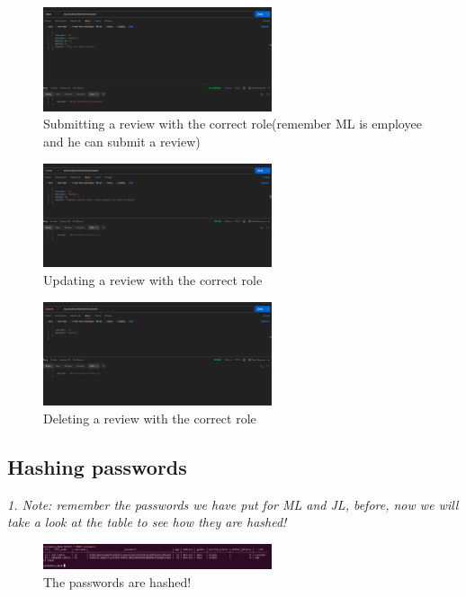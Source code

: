 \documentclass[a4paper,12pt]{article}
\begin{document}
\begin{figure}[H]
  \centering
  \includegraphics[width=0.6\textwidth]{images/26.png}
  \caption{Submitting a review with the correct role(remember ML is employee and he can submit a review)}
\end{figure}
\begin{figure}[H]
  \centering
  \includegraphics[width=0.6\textwidth]{images/27.png}
  \caption{Updating a review with the correct role}
\end{figure}
\begin{figure}[H]
  \centering
  \includegraphics[width=0.6\textwidth]{images/28.png}
  \caption{Deleting a review with the correct role}
\end{figure}
\subsection{Hashing passwords}
\textit{1. Note: remember the passwords we have put for ML and JL, before, now we will take a look at the table to see how they are hashed!}
\begin{figure}[H]
  \centering
  \includegraphics[width=0.6\textwidth]{images/29.png}
  \caption{The passwords are hashed!}
\end{figure}
\end{document}
